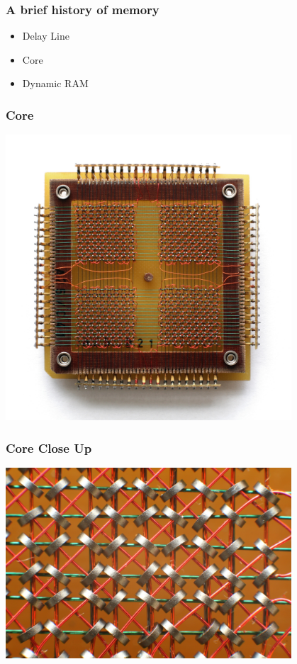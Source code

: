 \documentclass[pdftex]{beamer} %
\begin{document}
\begin{frame}
  \frametitle{A brief history of memory}
  \begin{itemize}
  \item Delay Line
  \item Core
  \item Dynamic RAM
  \end{itemize}
\end{frame}

\begin{frame}
  \frametitle{Core}
  \begin{center}
    \includegraphics[width=0.8\textwidth]{../../figures/KL_CoreMemory.jpg}
  \end{center}
  
\end{frame}

\begin{frame}
  \frametitle{Core Close Up}
  \begin{center}
    \includegraphics[width=0.8\textwidth]{../../figures/KL_Kernspeicher_Makro_1.jpg}
  \end{center}
\end{frame}
\end{document}
